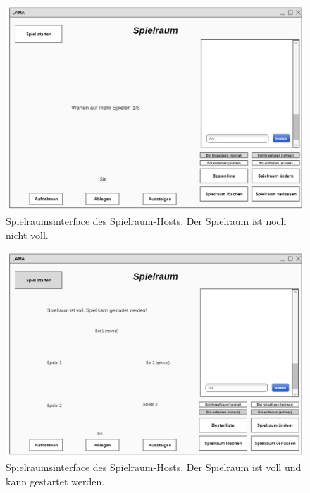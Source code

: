 \begin{figure}[h]
	\centering
	\includegraphics[width=\textwidth]{img/spielraumnichtvoll.png}
	\caption{Spielraumsinterface des Spielraum-Hosts. Der Spielraum ist noch nicht voll.}
	\label{gui:spielraumnichtvoll_h} 
\end{figure}

\begin{figure}[h]
	\centering
	\includegraphics[width=\textwidth]{img/Spielstarten.png}
	\caption{Spielraumsinterface des Spielraum-Hosts. Der Spielraum ist voll und kann gestartet werden.}
	\label{gui:spielraumstarten_h} 
\end{figure}

